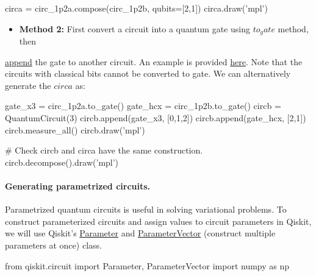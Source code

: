 \documentclass[%
oneside,                 %
final,                   %
10pt]{article}
\begin{document}
\epycod





\bpycod
circa = circ_1p2a.compose(circ_1p2b, qubits=[2,1])
circa.draw('mpl')

\epycod


\begin{itemize}
\item \textbf{Method 2:} First convert a circuit into a quantum gate using \href{{https://qiskit.org/documentation/stubs/qiskit.circuit.QuantumCircuit.to_gate.html}}{$to_gate$} method, then 
\end{itemize}

\noindent
\href{{https://qiskit.org/documentation/stubs/qiskit.circuit.QuantumCircuit.append.html#qiskit.circuit.QuantumCircuit.append}}{append} the gate to another circuit.
An example is provided \href{{https://www.youtube.com/watch?v=krhPpzkT_z4}}{here}.
Note that the circuits with classical bits cannot be converted to gate. We can alternatively generate the $circa$ as:









\bpycod
gate_x3 = circ_1p2a.to_gate()
gate_hcx = circ_1p2b.to_gate()
circb = QuantumCircuit(3)
circb.append(gate_x3, [0,1,2])
circb.append(gate_hcx, [2,1])
circb.measure_all()  
circb.draw('mpl')

\epycod





\bpycod
# Check circb and circa have the same construction.
circb.decompose().draw('mpl')

\epycod


\paragraph{Generating parametrized circuits.}
Parametrized quantum circuits is useful in solving variational problems. To construct parameterized circuits and assign values to circuit parameters in Qiskit, we will use Qiskit's \href{{https://qiskit.org/documentation/stubs/qiskit.circuit.Parameter.html}}{Parameter} and \href{{https://qiskit.org/documentation/stubs/qiskit.circuit.ParameterVector.html}}{ParameterVector} (construct multiple parameters at once) class.




\bpycod
from qiskit.circuit import Parameter, ParameterVector
import numpy as np
\end{document}
